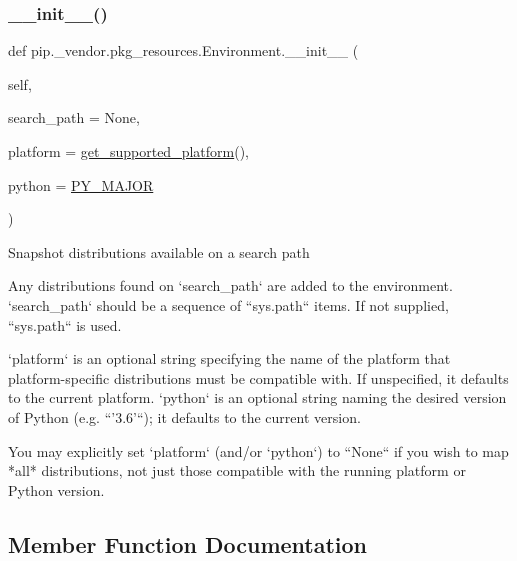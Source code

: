 \subsubsection{\texorpdfstring{\+\_\+\+\_\+init\+\_\+\+\_\+()}{\_\_init\_\_()}}
{\footnotesize\ttfamily def pip.\+\_\+vendor.\+pkg\+\_\+resources.\+Environment.\+\_\+\+\_\+init\+\_\+\+\_\+ (\begin{DoxyParamCaption}\item[{}]{self,  }\item[{}]{search\+\_\+path = {\ttfamily None},  }\item[{}]{platform = {\ttfamily \hyperlink{namespacepip_1_1__vendor_1_1pkg__resources_a2727b5097b331e5359881914dc788fb7}{get\+\_\+supported\+\_\+platform}()},  }\item[{}]{python = {\ttfamily \hyperlink{namespacepip_1_1__vendor_1_1pkg__resources_acca7e38274a92063eabc8c2b739d5ca4}{P\+Y\+\_\+\+M\+A\+J\+OR}} }\end{DoxyParamCaption})}

\begin{DoxyVerb}Snapshot distributions available on a search path

Any distributions found on `search_path` are added to the environment.
`search_path` should be a sequence of ``sys.path`` items.  If not
supplied, ``sys.path`` is used.

`platform` is an optional string specifying the name of the platform
that platform-specific distributions must be compatible with.  If
unspecified, it defaults to the current platform.  `python` is an
optional string naming the desired version of Python (e.g. ``'3.6'``);
it defaults to the current version.

You may explicitly set `platform` (and/or `python`) to ``None`` if you
wish to map *all* distributions, not just those compatible with the
running platform or Python version.
\end{DoxyVerb}
 

\subsection{Member Function Documentation}
\mbox{\label{classpip_1_1__vendor_1_1pkg__resources_1_1Environment_af19db2a1b6a02b04c1aa294add7e9aad}} 
